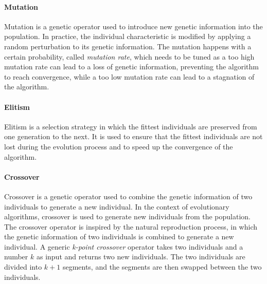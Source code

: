\paragraph{Mutation}

Mutation is a genetic operator used to introduce new genetic information into the population. In practice, the individual characteristic is modified by applying a random perturbation to its genetic information. The mutation happens with a certain probability, called \textit{mutation rate}, which needs to be tuned as a too high mutation rate can lead to a loss of genetic information, preventing the algorithm to reach convergence, while a too low mutation rate can lead to a stagnation of the algorithm.

\paragraph{Elitism}

Elitism is a selection strategy in which the fittest individuals are preserved from one generation to the next. It is used to ensure that the fittest individuals are not lost during the evolution process and to speed up the convergence of the algorithm.

\paragraph{Crossover}

Crossover is a genetic operator used to combine the genetic information of two individuals to generate a new individual. In the context of evolutionary algorithms, crossover is used to generate new individuals from the population. The crossover operator is inspired by the natural reproduction process, in which the genetic information of two individuals is combined to generate a new individual. A generic \textit{k-point crossover} operator takes two individuals and a number $k$ as input and returns two new individuals. The two individuals are divided into $k+1$ segments, and the segments are then swapped between the two individuals.